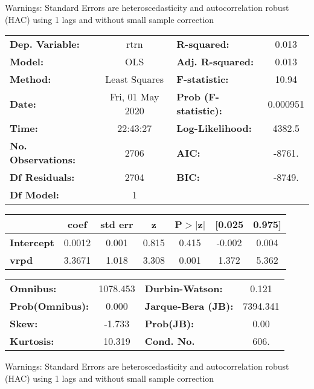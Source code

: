 Warnings: \newline
 [1] Standard Errors are heteroscedasticity and autocorrelation robust (HAC) using 1 lags and without small sample correction\begin{center}
\begin{tabular}{lclc}
\toprule
\textbf{Dep. Variable:}    &       rtrn       & \textbf{  R-squared:         } &     0.013   \\
\textbf{Model:}            &       OLS        & \textbf{  Adj. R-squared:    } &     0.013   \\
\textbf{Method:}           &  Least Squares   & \textbf{  F-statistic:       } &     10.94   \\
\textbf{Date:}             & Fri, 01 May 2020 & \textbf{  Prob (F-statistic):} &  0.000951   \\
\textbf{Time:}             &     22:43:27     & \textbf{  Log-Likelihood:    } &    4382.5   \\
\textbf{No. Observations:} &        2706      & \textbf{  AIC:               } &    -8761.   \\
\textbf{Df Residuals:}     &        2704      & \textbf{  BIC:               } &    -8749.   \\
\textbf{Df Model:}         &           1      & \textbf{                     } &             \\
\bottomrule
\end{tabular}
\begin{tabular}{lcccccc}
                   & \textbf{coef} & \textbf{std err} & \textbf{z} & \textbf{P$> |$z$|$} & \textbf{[0.025} & \textbf{0.975]}  \\
\midrule
\textbf{Intercept} &       0.0012  &        0.001     &     0.815  &         0.415        &       -0.002    &        0.004     \\
\textbf{vrpd}      &       3.3671  &        1.018     &     3.308  &         0.001        &        1.372    &        5.362     \\
\bottomrule
\end{tabular}
\begin{tabular}{lclc}
\textbf{Omnibus:}       & 1078.453 & \textbf{  Durbin-Watson:     } &    0.121  \\
\textbf{Prob(Omnibus):} &   0.000  & \textbf{  Jarque-Bera (JB):  } & 7394.341  \\
\textbf{Skew:}          &  -1.733  & \textbf{  Prob(JB):          } &     0.00  \\
\textbf{Kurtosis:}      &  10.319  & \textbf{  Cond. No.          } &     606.  \\
\bottomrule
\end{tabular}
\end{center}

Warnings: \newline
 [1] Standard Errors are heteroscedasticity and autocorrelation robust (HAC) using 1 lags and without small sample correction